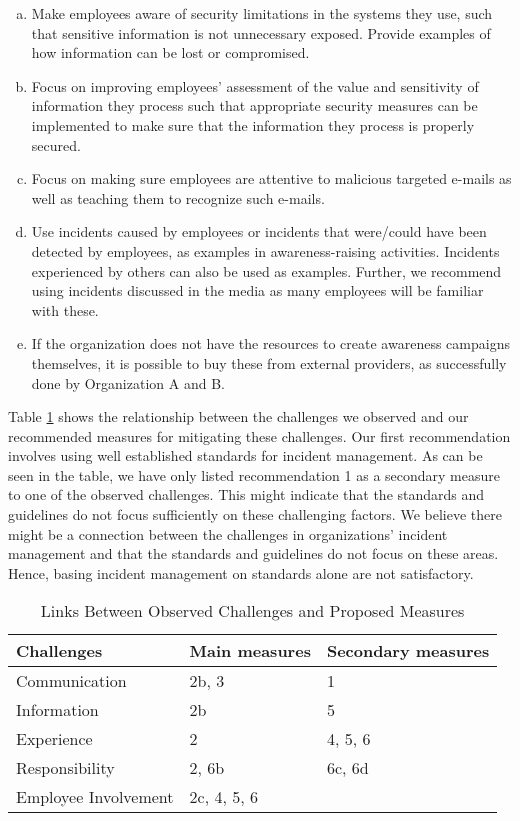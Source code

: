 \begin{enumerate}
\begin{enumerate}[a)]
\item Make employees aware of security limitations in the systems they use, such that sensitive information is not unnecessary exposed. Provide examples of how information can be lost or compromised.
\item Focus on improving employees' assessment of the value and sensitivity of information they process such that appropriate security measures can be implemented to make sure that the information they process is properly secured. 
\item Focus on making sure employees are attentive to malicious targeted e-mails as well as teaching them to recognize such e-mails.
\item Use incidents caused by employees or incidents that were/could have been detected by employees, as examples in awareness-raising activities. Incidents experienced by others can also be used as examples. Further, we recommend using incidents discussed in the media as many employees will be familiar with these. 
\item If the organization does not have the resources to create awareness campaigns themselves, it is possible to buy these from external providers, as successfully done by Organization A and B.
\end{enumerate}
\end{enumerate}

Table \ref{tab:challengesAndMeasures} shows the relationship between the challenges we observed and our recommended measures for mitigating these challenges. Our first recommendation involves using well established standards for incident management. As can be seen in the table, we have only listed recommendation 1 as a secondary measure to one of the observed challenges. This might indicate that the standards and guidelines do not focus sufficiently on these challenging factors. We believe there might be a connection between the challenges in organizations' incident management and that the standards and guidelines do not focus on these areas. Hence, basing incident management on standards alone are not satisfactory.

\begin{table}[H]
\begin{center}
\begin{tabular}{| l | l | l |}
\hline
  \textbf{Challenges} & \textbf{Main measures} & \textbf{Secondary measures} \\
  \hline
  Communication & 2b, 3 & 1 \\
  \hline
  Information & 2b & 5 \\
  \hline
  Experience & 2 & 4, 5, 6 \\
  \hline
  Responsibility & 2, 6b & 6c, 6d \\
  \hline
  Employee Involvement & 2c, 4, 5, 6 &  \\
\hline
\end{tabular}
\label{tab:challengesAndMeasures}
\caption{Links Between Observed Challenges and Proposed Measures}
\end{center}
\end{table}

